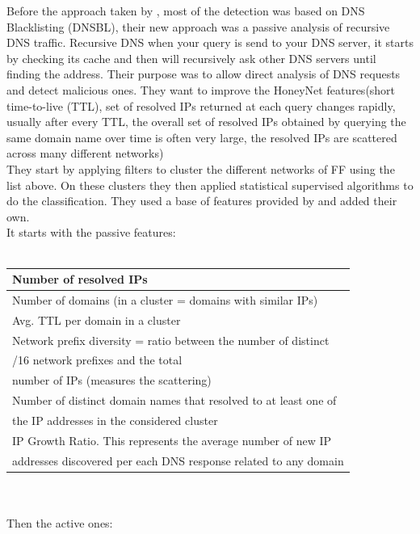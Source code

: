Before the approach taken by \cite{ff2}, most of the detection was based on DNS Blacklisting (DNSBL), their new approach was a passive analysis of recursive DNS traffic. Recursive DNS  when your query is send to your DNS server, it starts by checking its cache and then will recursively ask other DNS servers until finding the address. Their purpose was to allow direct analysis of DNS requests and detect malicious ones. They want to improve the HoneyNet\cite{honeynet} features(short time-to-live (TTL), set of resolved IPs returned at each query changes rapidly, usually after every TTL, the overall set of resolved IPs obtained by querying the same domain name over time is often very large, the resolved IPs are scattered across many different networks)\\
They start by applying filters to cluster the different networks of FF using the list above. On these clusters they then applied statistical supervised algorithms to do the classification. They used a base of features provided by \cite{fluXOR} and added their own. \\It starts with the passive features: \\\\
\begin{tabular}{|l|}
\hline
Number of resolved IPs\\
\hline
Number of domains (in a cluster = domains with similar IPs)\\
\hline
Avg. TTL per domain in a cluster\\
\hline
Network prefix diversity = ratio between the number of distinct\\ /16 network prefixes and the total \\
\hline
number of IPs (measures the scattering)\\
\hline
Number of distinct domain names that resolved to at least one of \\the IP addresses in the considered cluster\\
\hline
IP Growth Ratio. This represents the average number
of new IP\\ addresses discovered per each DNS response related to any domain\\
\hline
\end{tabular}
\\\\
Then the active ones:\\\\
